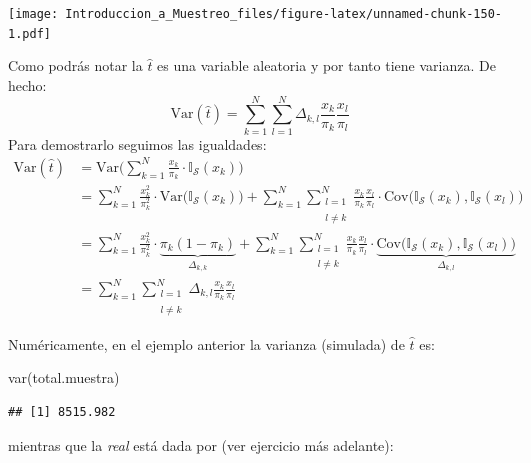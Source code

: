 \documentclass[
]{book}
\newenvironment{Shaded}{\begin{snugshade}}{\end{snugshade}}
\newcommand{\FunctionTok}[1]{\textcolor[rgb]{0.00,0.00,0.00}{#1}}
\newcommand{\NormalTok}[1]{#1}
\begin{document}
\texttt{[image: Introduccion\_a\_Muestreo\_files/figure-latex/unnamed-chunk-150-1.pdf]}

Como podrás notar la \(\hat{t}\) es una variable aleatoria y por tanto tiene varianza. De hecho:
\[
\textrm{Var}(\hat{t}) = \sum\limits_{k = 1}^N \sum\limits_{l = 1}^N \Delta_{k,l} \frac{x_k}{\pi_k} \frac{x_l}{\pi_l}
\]
Para demostrarlo seguimos las igualdades:
\begin{equation}\nonumber
\begin{aligned}
\textrm{Var}(\hat{t})  & = \textrm{Var}\Bigg( \sum\limits_{k=1}^N \frac{x_k}{\pi_k} \cdot \mathbb{I}_{\mathcal{S}}(x_k) \Bigg)
\\ & = \sum\limits_{k=1}^N  \frac{x_k^2}{\pi_k^2} \cdot \textrm{Var}\Big(\mathbb{I}_{\mathcal{S}}(x_k) \Big) + \sum\limits_{k = 1}^N \sum\limits_{\substack{l = 1 \\ \\ l \neq k}}^{N}  \frac{x_k}{\pi_k}  \frac{x_l}{\pi_l} \cdot \textrm{Cov}\Big(\mathbb{I}_{\mathcal{S}}(x_k), \mathbb{I}_{\mathcal{S}}(x_l) \Big)
\\ & = \sum\limits_{k=1}^N  \frac{x_k^2}{\pi_k^2} \cdot \underbrace{\pi_k (1 - \pi_k)}_{\Delta_{k,k}} + \sum\limits_{k = 1}^N \sum\limits_{\substack{l = 1 \\ \\ l \neq k}}^{N} \frac{x_k}{\pi_k}  \frac{x_l}{\pi_l} \cdot \underbrace{\textrm{Cov}\Big(\mathbb{I}_{\mathcal{S}}(x_k), \mathbb{I}_{\mathcal{S}}(x_l) \Big)}_{\Delta_{k,l}}
\\ & = \sum\limits_{k = 1}^N \sum\limits_{\substack{l = 1 \\ \\ l \neq k}}^{N}\Delta_{k,l} \frac{x_k}{\pi_k} \frac{x_l}{\pi_l}
\end{aligned}
\end{equation}

Numéricamente, en el ejemplo anterior la varianza (simulada) de \(\hat{t}\) es:

\begin{Shaded}
\begin{Highlighting}[]
\FunctionTok{var}\NormalTok{(total.muestra)}
\end{Highlighting}
\end{Shaded}

\begin{verbatim}
## [1] 8515.982
\end{verbatim}

mientras que la \emph{real} está dada por (ver ejercicio más adelante):
\end{document}

